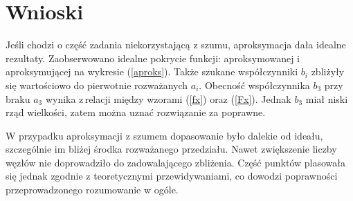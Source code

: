 \newpage
\section{Wnioski}

Jeśli chodzi o część zadania niekorzystającą z szumu, aproksymacja dała idealne rezultaty. Zaobserwowano idealne pokrycie funkcji: aproksymowanej i aproksymującej na wykresie (\ref{aproks}). Także szukane współczynniki $ b_i $ zbliżyły się wartościowo do pierwotnie rozważanych $ a_i $. Obecność współczynnika $ b_3 $ przy braku $a_3$ wynika z\,relacji między wzorami (\ref{fx}) oraz (\ref{Fx}). Jednak $ b_3 $ miał niski rząd wielkości, zatem można uznać rozwiązanie za poprawne.

W przypadku aproksymacji z szumem dopasowanie było dalekie od ideału, szczególnie im bliżej środka rozważanego przedziału. Nawet zwiększenie liczby węzłów nie doprowadziło do zadowalającego zbliżenia. Część punktów plasowała się jednak zgodnie z teoretycznymi przewidywaniami, co dowodzi poprawności przeprowadzonego rozumowanie w ogóle.

